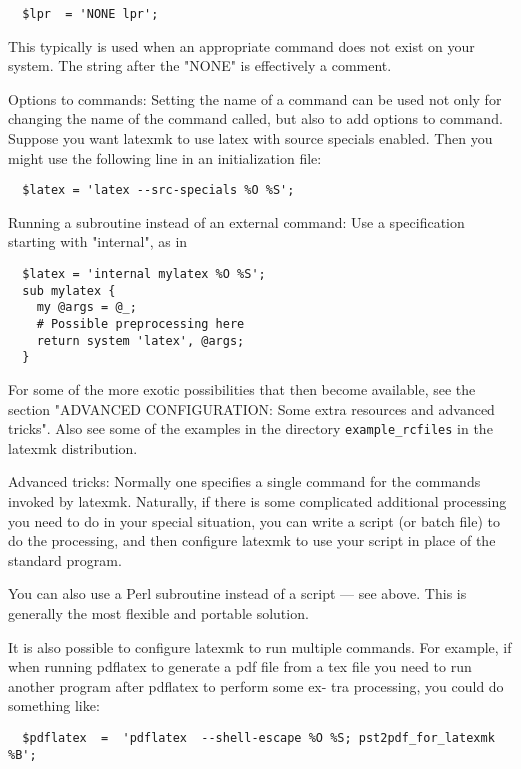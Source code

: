 \begin{verbatim}
  $lpr  = 'NONE lpr';
\end{verbatim}

This typically is used when an appropriate command does  not  exist  on
your system.  The string after the "NONE" is effectively a comment.

Options to commands: Setting the name of a command can be used not only
for changing the name of the command called, but also to add options to
command.   Suppose  you  want latexmk to use latex with source specials
enabled.  Then you might use the following line  in  an  initialization
file:

\begin{verbatim}
  $latex = 'latex --src-specials %O %S';
\end{verbatim}

Running  a  subroutine instead of an external command: Use a specification
starting with "internal", as in

\begin{verbatim}
  $latex = 'internal mylatex %O %S';
  sub mylatex {
    my @args = @_;
    # Possible preprocessing here
    return system 'latex', @args;
  }
\end{verbatim}

For some of the more exotic possibilities that then  become  available, see
the  section "ADVANCED CONFIGURATION: Some extra resources and advanced
tricks". Also see some of the examples in  the  directory  \verb|example_rcfiles| in
the latexmk distribution.

Advanced  tricks:  Normally one specifies a single command for the commands
invoked by latexmk.  Naturally, if there is some complicated  additional
processing  you need to do in your special situation, you can write a script
(or batch file) to do the processing, and then configure latexmk to use your
script in place of the standard program.

You  can  also  use a Perl subroutine instead of a script --- see above.
This is generally the most flexible and portable solution.

It is also possible to configure latexmk to run multiple commands.  For
example,  if  when  running  pdflatex to generate a pdf file from a tex
file you need to run another program after pdflatex to perform some ex-
tra processing, you could do something like:

\begin{verbatim}
  $pdflatex  =  'pdflatex  --shell-escape %O %S; pst2pdf_for_latexmk %B';
\end{verbatim}

